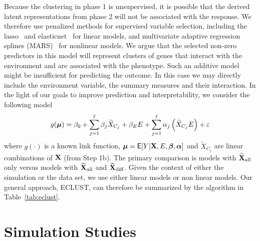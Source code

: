 Because the clustering in phase 1 is unsupervised, it is possible that the derived latent representations from phase 2 will not be associated with the response. We therefore use penalized methods for supervised variable selection, including the lasso~\citep{tibshirani1996regression} and elasticnet~\citep{zou2005regularization} for linear models, and multivariate adaptive regression splines (MARS)~\citep{friedman1991multivariate} for nonlinear models. We argue that the selected non-zero predictors in this model will represent clusters of genes that interact with the environment and are associated with the phenotype. Such an additive model might be insufficient for predicting the outcome. In this case we may directly include the environment variable, the summary measures and their interaction. In the light of our goals to improve prediction and interpretability, we consider the following model
\begin{equation}  
g(\boldsymbol{\mu}) = \beta_0 + \sum_{j=1}^{\ell} \beta_j \widetilde{X}_{C_j} + \beta_E E + 
\sum_{j=1}^{\ell} \alpha_j \left(\widetilde{X}_{C_j} E \right) + \varepsilon
\label{eq:linpred1.1}
\end{equation}
where $g(\cdot)$ is a known link function, $\boldsymbol{\mu} = \mathsf{E}[Y|\mathbf{X},E,\boldsymbol{\beta}, \boldsymbol{\alpha}]$ and   $\widetilde{X}_{C_j}$ are linear combinations of $\mathbf{X}$ (from Step 1b). The primary comparison is models with $\widetilde{\mathbf{X}}_{\textrm{{all}}}$ only versus models with $\widetilde{\mathbf{X}}_{\textrm{{all}}}$ and $\widetilde{\mathbf{X}}_{\textrm{{diff}}}$. Given the context of either the simulation or the data set, we use either linear models or non linear models. Our general approach, ECLUST, can therefore be summarized by the algorithm in Table~\ref{tab:eclust}. 




\section{Simulation Studies}

